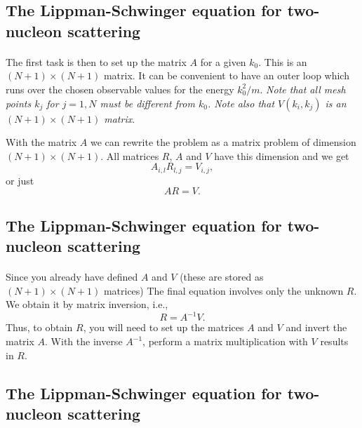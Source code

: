 \documentclass[%
twoside,                 %
final,                   %
10pt]{article}
\begin{document}
\subsection*{The Lippman-Schwinger equation for two-nucleon scattering}

\paragraph{}
The first task is then to 
set up the matrix $A$ for a given $k_0$. This is an
$(N+1)\times (N+1)$ matrix. It can be convenient
to have an outer loop which runs over the chosen
observable values for the energy $k_0^2/m$.
{\em Note that all mesh points $k_j$ for $j=1,N$ must be
different from $k_0$. Note also that
$V(k_i,k_j)$ is an
$(N+1)\times (N+1)$ matrix}. 

With the matrix $A$ we can rewrite the problem as a matrix problem of dimension $(N+1)\times (N+1)$.
All matrices $R$, $A$ and $V$ have this dimension and we get
\[
    A_{i,l}R_{l,j}=V_{i,j},
\] 
or just
\[
    AR=V.
\]



\subsection*{The Lippman-Schwinger equation for two-nucleon scattering}

\paragraph{}
Since you already have defined $A$ and $V$
(these are stored as $(N+1)\times (N+1)$ matrices) 
The final equation involves only the unknown
$R$. We obtain it by matrix inversion, i.e.,
\begin{equation}
    R=A^{-1}V.
    \label{eq:final2}
\end{equation}
Thus, to obtain $R$, you will need to set up the matrices
$A$ and $V$ and invert the matrix $A$. 
With the inverse $A^{-1}$, perform
a matrix multiplication with $V$ results in $R$.



\subsection*{The Lippman-Schwinger equation for two-nucleon scattering}
\end{document}

